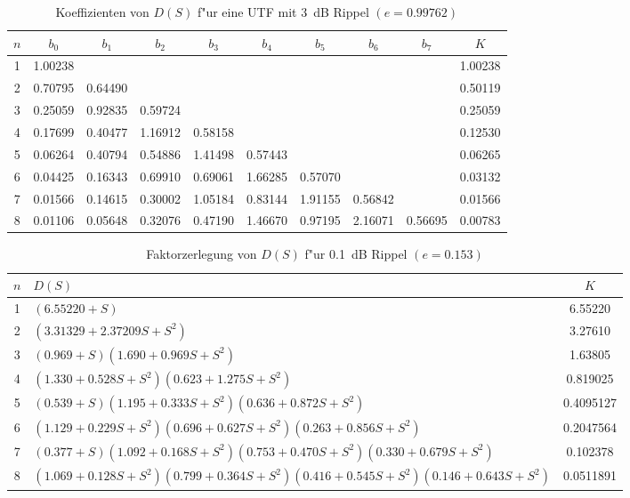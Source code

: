\begin{table}[!htb]
\begin{center}
{\footnotesize
\begin{tabular}{|c||c|c|c|c|c|c|c|c||c|}\hline
$n$ & $b_0$ & $b_1$ & $b_2$ & $b_3$ & $b_4$ & $b_5$ & $b_6$ & $b_7$ & $K$\\ \hline\hline
 1 & 1.00238 & & & & & & & & 1.00238   \\ \hline
 2 & 0.70795 & 0.64490 & & & & & & & 0.50119 \\ \hline
 3 & 0.25059 & 0.92835 & 0.59724 & & & & & & 0.25059  \\ \hline
 4 & 0.17699 & 0.40477 & 1.16912 & 0.58158 & & & & & 0.12530 \\ \hline
 5 & 0.06264 & 0.40794 & 0.54886 & 1.41498 & 0.57443 & & & & 0.06265  \\ \hline
 6 & 0.04425 & 0.16343 & 0.69910 & 0.69061 & 1.66285 & 0.57070 & & & 0.03132  \\ \hline   
 7 & 0.01566 & 0.14615 & 0.30002 & 1.05184 & 0.83144 & 1.91155 & 0.56842 & & 0.01566 \\ \hline   
 8 & 0.01106 & 0.05648 & 0.32076 & 0.47190 & 1.46670 & 0.97195 & 2.16071 & 0.56695 & 0.00783 \\ \hline
\end{tabular}\vspace*{-1mm}\caption{Koeffizienten von $D(S)$ f"ur eine UTF mit 3~dB Rippel $(e=0.99762)$} \label{koef-3}
}
\end{center}
\vspace*{-4mm}
\end{table}

\begin{table}[!htb]
\begin{center}
{\footnotesize
\begin{tabular}{|c||l||c|}\hline
$n$ & $D(S)$ & $K$ \\ \hline\hline
 1 & $(6.55220+S)$  & 6.55220      \\ \hline
 2 & $(3.31329+2.37209S+S^2)$& 3.27610 \\ \hline
 3 & $(0.969+S)(1.690+0.969S+S^2)$ & 1.63805  \\ \hline
 4 & $(1.330+0.528S+S^2)(0.623+1.275S+S^2)$ & 0.819025 \\ \hline
 5 & $(0.539+S)(1.195+0.333S+S^2)(0.636+0.872S+S^2)$ & 0.4095127   \\ \hline
 6 & $(1.129+0.229S+S^2)(0.696+0.627S+S^2)(0.263+0.856S+S^2)$ & 0.2047564 \\ \hline   
 7 & $(0.377+S)(1.092+0.168S+S^2)(0.753+0.470S+S^2)(0.330+0.679S+S^2)$  & 0.102378  \\ \hline   
 8 & $(1.069+0.128S+S^2)(0.799+0.364S+S^2)(0.416+0.545S+S^2)(0.146+0.643S+S^2)$  & 0.0511891 \\ \hline
\end{tabular}\vspace*{-2mm}\caption{Faktorzerlegung von $D(S)$ f"ur 0.1~dB Rippel $(e=0.153)$}\label{fak-0.1}
}
\end{center}
\vspace*{-6mm}
\end{table}

